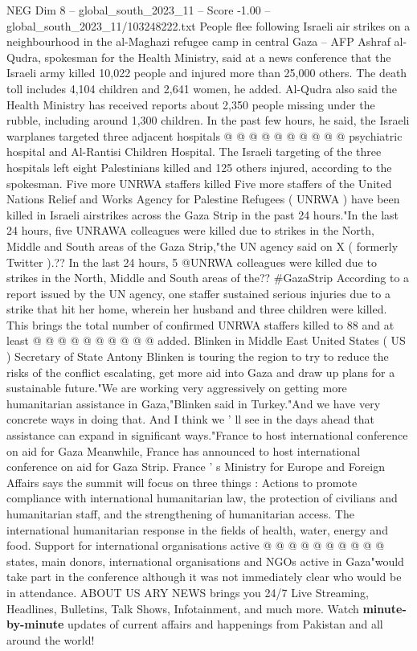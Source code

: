 \begin{textsample}{NEG Dim 8 – global\_south\_2023\_11 – Score -1.00 – global\_south\_2023\_11/103248222.txt}
People flee following Israeli air strikes on a neighbourhood in the al-Maghazi refugee camp in central Gaza -- AFP Ashraf al-Qudra, spokesman for the Health Ministry, said at a news conference that the Israeli army killed 10,022 people and injured more than 25,000 others.
The death toll includes 4,104 children and 2,641 women, he added.
Al-Qudra also said the Health Ministry has received reports about 2,350 people missing under the rubble, including around 1,300 children.
In the past few hours, he said, the Israeli warplanes targeted three adjacent hospitals @ @ @ @ @ @ @ @ @ @ psychiatric hospital and Al-Rantisi Children Hospital.
The Israeli targeting of the three hospitals left eight Palestinians killed and 125 others injured, according to the spokesman.
Five more UNRWA staffers killed Five more staffers of the United Nations Relief and Works Agency for Palestine Refugees ( UNRWA ) have been killed in Israeli airstrikes across the Gaza Strip in the past 24 hours."In the last 24 hours, five UNRAWA colleagues were killed due to strikes in the North, Middle and South areas of the Gaza Strip,"the UN agency said on X ( formerly Twitter ).??
In the last 24 hours, 5 @UNRWA colleagues were killed due to strikes in the North, Middle and South areas of the?? \#GazaStrip According to a report issued by the UN agency, one staffer sustained serious injuries due to a strike that hit her home, wherein her husband and three children were killed.
This brings the total number of confirmed UNRWA staffers killed to 88 and at least @ @ @ @ @ @ @ @ @ @ added.
Blinken in Middle East United States ( US ) Secretary of State Antony Blinken is touring the region to try to reduce the risks of the conflict escalating, get more aid into Gaza and draw up plans for a sustainable future."We are working very aggressively on getting more humanitarian assistance in Gaza,"Blinken said in Turkey."And we have very concrete ways in doing that.
And I think we ' ll see in the days ahead that assistance can expand in significant ways."France to host international conference on aid for Gaza Meanwhile, France has announced to host international conference on aid for Gaza Strip.
France ' s Ministry for Europe and Foreign Affairs says the summit will focus on three things : Actions to promote compliance with international humanitarian law, the protection of civilians and humanitarian staff, and the strengthening of humanitarian access.
The international humanitarian response in the fields of health, water, energy and food.
Support for international organisations active @ @ @ @ @ @ @ @ @ @ states, main donors, international organisations and NGOs active in Gaza"would take part in the conference although it was not immediately clear who would be in attendance.
ABOUT US ARY NEWS brings you 24/7 Live Streaming, Headlines, Bulletins, Talk Shows, Infotainment, and much more.
Watch \textbf{minute-by-minute} updates of current affairs and happenings from Pakistan and all around the world!

\end{textsample}
